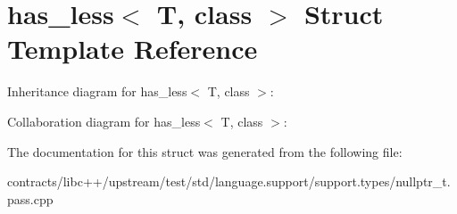 \hypertarget{structhas__less}{}\section{has\+\_\+less$<$ T, class $>$ Struct Template Reference}
\label{structhas__less}


Inheritance diagram for has\+\_\+less$<$ T, class $>$\+:


Collaboration diagram for has\+\_\+less$<$ T, class $>$\+:


The documentation for this struct was generated from the following file\+:\begin{DoxyCompactItemize}
\item 
contracts/libc++/upstream/test/std/language.\+support/support.\+types/nullptr\+\_\+t.\+pass.\+cpp\end{DoxyCompactItemize}

